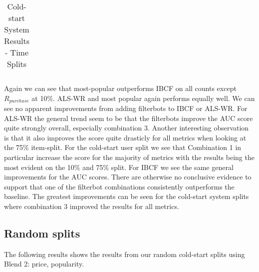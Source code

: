 \begin{table}[H]
{\begin{tabular}{*{17}{l}}
\bottomrule
\end{tabular}
}
\caption{Cold-start System Results - Time Splits}
\end{table}

Again we can see that most-popular outperforms IBCF on all counts except $R_{purchase}$ at 10\%. ALS-WR and most popular again performs equally well.
We can see no apparent improvements from adding filterbots to IBCF or ALS-WR. For ALS-WR the general trend seem to be that the filterbots improve the AUC score
quite strongly overall, especially combination 3. Another interesting observation is that it also improves the score quite drasticly for all metrics when looking at the 75\% item-split.
For the cold-start user split we see that Combination 1 in particular increase the score for the majority of metrics with the results being the most evident on
the 10\% and 75\% split. For IBCF we see the same general improvements for the AUC scores. There are otherwise no conclusive evidence to support that one of the filterbot
combinations consistently outperforms the baseline. The greatest improvements can be seen for the cold-start system splits where combination 3 improved the results
for all metrics.

\subsection{Random splits}

The following results shows the results from our random cold-start splits using Blend 2: price, popularity.

